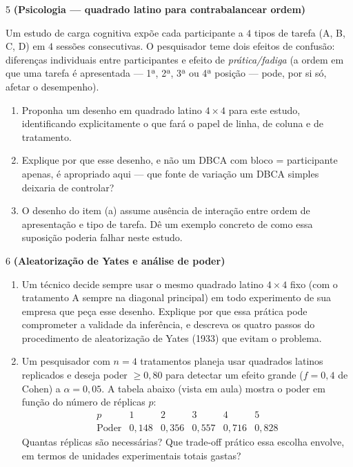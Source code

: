 \documentclass[11pt]{article}
\begin{document}
\begin{questao}{5} \textbf{(Psicologia --- quadrado latino para contrabalancear ordem)}

Um estudo de carga cognitiva expõe cada participante a $4$ tipos de tarefa (A, B, C, D) em $4$
sessões consecutivas. O pesquisador teme dois efeitos de confusão: diferenças individuais entre
participantes e efeito de \emph{prática/fadiga} (a ordem em que uma tarefa é apresentada — 1ª,
2ª, 3ª ou 4ª posição — pode, por si só, afetar o desempenho).

\begin{enumerate}[label=(\alph*)]
  \item Proponha um desenho em quadrado latino $4\times4$ para este estudo, identificando
    explicitamente o que fará o papel de linha, de coluna e de tratamento.
  \item Explique por que esse desenho, e não um DBCA com bloco = participante apenas, é apropriado
    aqui — que fonte de variação um DBCA simples deixaria de controlar?
  \item O desenho do item (a) assume ausência de interação entre ordem de apresentação e tipo de
    tarefa. Dê um exemplo concreto de como essa suposição poderia falhar neste estudo.
\end{enumerate}
\end{questao}

\begin{questao}{6} \textbf{(Aleatorização de Yates e análise de poder)}

\begin{enumerate}[label=(\alph*)]
  \item Um técnico decide sempre usar o mesmo quadrado latino $4\times4$ fixo (com o tratamento A
    sempre na diagonal principal) em todo experimento de sua empresa que peça esse desenho.
    Explique por que essa prática pode comprometer a validade da inferência, e descreva os quatro
    passos do procedimento de aleatorização de Yates (1933) que evitam o problema.
  \item Um pesquisador com $n=4$ tratamentos planeja usar quadrados latinos replicados e deseja
    poder $\ge0{,}80$ para detectar um efeito grande ($f=0{,}4$ de Cohen) a $\alpha=0{,}05$. A
    tabela abaixo (vista em aula) mostra o poder em função do número de réplicas $p$:
    $$
    \begin{array}{c|ccccc}
    p & 1 & 2 & 3 & 4 & 5 \\\hline
    \text{Poder} & 0{,}148 & 0{,}356 & 0{,}557 & 0{,}716 & 0{,}828
    \end{array}
    $$
    Quantas réplicas são necessárias? Que trade-off prático essa escolha envolve, em termos de
    unidades experimentais totais gastas?
\end{enumerate}
\end{questao}
\end{document}
